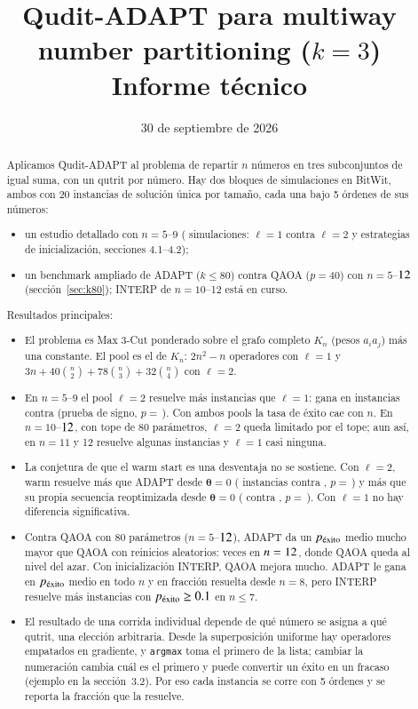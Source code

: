 \documentclass[11pt,a4paper]{article}
\title{\textbf{Qudit-ADAPT para multiway number partitioning ($k=3$)}\\[3pt]
\large Informe técnico}
\date{30 de septiembre de 2026}
\author{}
\newcommand{\pex}{p_{\rm \acute{e}xito}}
\begin{document}
\maketitle
\vspace{-2.5em}

\begin{abstract}
\noindent Aplicamos Qudit-ADAPT al problema de repartir $n$ números en tres subconjuntos de igual
suma, con un qutrit por número. Hay dos bloques de simulaciones en BitWit, ambos con 20 instancias
de solución única por tamaño, cada una bajo 5 órdenes de sus números:
\begin{itemize}
\item un estudio detallado con $n=5$--$9$ (\TotalTodo{} simulaciones: $\ell=1$ contra $\ell=2$ y
  estrategias de inicialización, secciones 4.1--4.2);
\item un benchmark ampliado de ADAPT ($k\leq80$) contra QAOA ($p=40$) con $n=5$--$12$
  (sección~\ref{sec:k80}); INTERP de $n=10$--12 está en curso.
\end{itemize}
Resultados principales:
\begin{itemize}
\item El problema es Max 3-Cut ponderado sobre el grafo completo $K_n$ (pesos $a_ia_j$) más una
  constante. El pool es el de $K_n$: $2n^2-n$ operadores con $\ell=1$ y
  $3n+40\binom{n}{2}+78\binom{n}{3}+32\binom{n}{4}$ con $\ell=2$.
\item En $n=5$--9 el pool $\ell=2$ resuelve más instancias que $\ell=1$: gana en \OcSignoDos{}
  instancias contra \OcSignoUno{} (prueba de signo, $p=$\,\OcSignoP). Con ambos pools la tasa de
  éxito cae con $n$. En $n=10$--$12$, con tope de 80 parámetros, $\ell=2$ queda limitado por el
  tope; aun así, en $n=11$ y 12 resuelve algunas instancias y $\ell=1$ casi ninguna.
\item La conjetura de que el warm start es una desventaja no se sostiene. Con $\ell=2$, warm
  resuelve más que ADAPT desde $\bm\theta=0$ (\EstColdLDosWarm{} instancias contra
  \EstColdLDosOtra, $p=$\,\EstColdLDosP) y más que su propia secuencia reoptimizada desde
  $\bm\theta=0$ (\EstFijaLDosWarm{} contra \EstFijaLDosOtra, $p=$\,\EstFijaLDosP). Con $\ell=1$ no
  hay diferencia significativa.
\item Contra QAOA con 80 parámetros ($n=5$--$12$), ADAPT da un $\pex$ medio
  mucho mayor que QAOA con reinicios aleatorios: \KRazonNmax{} veces en $n=12$, donde QAOA queda
  al nivel del azar. Con inicialización INTERP, QAOA mejora mucho. ADAPT le gana en $\pex$ medio en
  todo $n$ y en fracción resuelta desde $n=8$, pero INTERP resuelve más instancias con $\pex\geq0.1$
  en $n\leq7$.
\item El resultado de una corrida individual depende de qué número se asigna a qué qutrit, una
  elección arbitraria. Desde la superposición uniforme hay operadores empatados en gradiente, y
  \texttt{argmax} toma el primero de la lista; cambiar la numeración cambia cuál es el primero y
  puede convertir un éxito en un fracaso (ejemplo en la sección~3.2). Por eso cada instancia se corre
  con 5 órdenes y se reporta la fracción que la resuelve.
\end{itemize}
\end{abstract}
\end{document}
